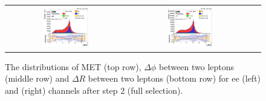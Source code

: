 \begin{figure}[ht]
\begin{center}
\begin{tabular}{ccc}
      \includegraphics[width=0.4\textwidth]{figures/tW/fig/Step2/ee/H_ll_DR.png}&
      \includegraphics[width=0.4\textwidth]{figures/tW/fig/Step2/mumu/H_ll_DR.png}\\
    \end{tabular}
    \caption{The distributions of MET (top row), $\Delta\phi$ between two leptons (middle row) and $\Delta R$ between two leptons (bottom row) for ee (left) and \mumu (right) channels after step 2 (full selection).
    \label{fig:step2_MET_phi_Dphi_DR}}
  \end{center}
\end{figure}

